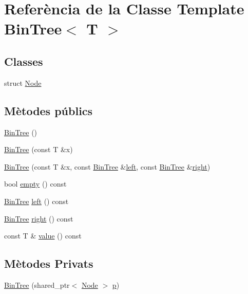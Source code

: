 \hypertarget{class_bin_tree}{}\section{Referència de la Classe Template Bin\+Tree$<$ T $>$}
\label{class_bin_tree}
\subsection*{Classes}
\begin{DoxyCompactItemize}
\item 
struct \hyperlink{struct_bin_tree_1_1_node}{Node}
\end{DoxyCompactItemize}
\subsection*{Mètodes públics}
\begin{DoxyCompactItemize}
\item 
\hyperlink{class_bin_tree_a47eef22d29cd023449d97c073c08e5b6}{Bin\+Tree} ()
\item 
\hyperlink{class_bin_tree_a1ab686e0bcf990093ff91fe71744c1a4}{Bin\+Tree} (const T \&x)
\item 
\hyperlink{class_bin_tree_adb7eeff76d08130c943b36af215eb521}{Bin\+Tree} (const T \&x, const \hyperlink{class_bin_tree}{Bin\+Tree} \&\hyperlink{class_bin_tree_a82108db4c1b08d1f111027788c196d4e}{left}, const \hyperlink{class_bin_tree}{Bin\+Tree} \&\hyperlink{class_bin_tree_aff8e96651b27284c329667b5ad3e4d0b}{right})
\item 
bool \hyperlink{class_bin_tree_a74cda259ba5c25b8ee38ed4dc33e4fad}{empty} () const
\item 
\hyperlink{class_bin_tree}{Bin\+Tree} \hyperlink{class_bin_tree_a82108db4c1b08d1f111027788c196d4e}{left} () const
\item 
\hyperlink{class_bin_tree}{Bin\+Tree} \hyperlink{class_bin_tree_aff8e96651b27284c329667b5ad3e4d0b}{right} () const
\item 
const T \& \hyperlink{class_bin_tree_a734e785b089c87b49187ee7c58edf5f3}{value} () const
\end{DoxyCompactItemize}
\subsection*{Mètodes Privats}
\begin{DoxyCompactItemize}
\item 
\hyperlink{class_bin_tree_a1408d37d1afda12d99747d09543c15f4}{Bin\+Tree} (shared\+\_\+ptr$<$ \hyperlink{struct_bin_tree_1_1_node}{Node} $>$ \hyperlink{class_bin_tree_afe3647af1dda90f6ddf1deee6560fcf1}{p})
\end{DoxyCompactItemize}
